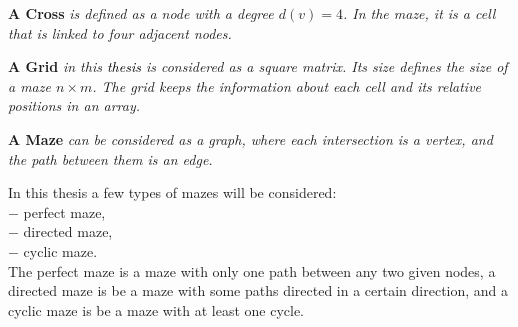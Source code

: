 \begin{definition}\textbf{A Cross} \emph{is defined as a node with a degree $d(v) = 4$. In the maze, it is a cell that is linked to four adjacent nodes. }\end{definition}
\begin{definition}\textbf{A Grid} \emph{in this \textcolor{black}{thesis} is considered as a square matrix. Its size defines the size of a maze $n \times m$. The grid keeps the information about each cell and its relative positions in an array.}\end{definition}
\newpage
\begin{definition}\textbf{A Maze} \emph{can be considered as a graph, where each intersection is a vertex, and the path between them is an edge. }\end{definition}
\noindent In this thesis a few types of mazes will be considered:\\
$-$ perfect maze,\\
$-$ directed maze,\\
$-$ cyclic maze.\\
The perfect maze is a maze with only one path between any two given nodes, a directed maze is be a maze with some paths directed in a certain direction,
and a cyclic maze is be a maze with at least one cycle.\\ 

